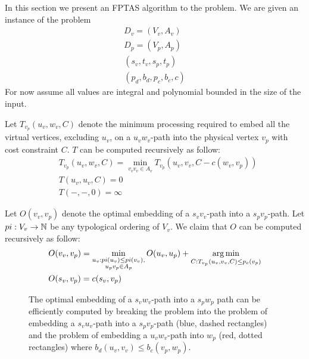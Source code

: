 In this section we present an FPTAS algorithm to the \VPN problem.
We are given an instance of the \VPN problem 
\begin{align*}
D_v = (V_v, A_v)		\\
D_p = (V_p, A_p)		\\
(s_v, t_v, s_p, t_p)	\\
(p_d, b_d, p_c, b_c, c)
\end{align*}
For now assume all values are integral and polynomial bounded in the size of the input.

Let $T_{v_p}(u_v, w_v, C)$ denote the minimum processing required to embed
all the virtual vertices, excluding $u_v$, on a $u_vw_v$-path into the physical
vertex $v_p$ with cost constraint $C$.
$T$ can be computed recursively as follow:
\begin{align*}
&T_{v_p}(u_v, w_v, C) = 
\min_{v_vv_v \in A_v} T_{v_p}(u_v, v_v, C - c(w_v, v_p))
\\
&T(u_v, u_v, C) = 0
\\
&T(-, -, 0) = \infty
\end{align*}
 
Let $O(v_v, v_p)$ denote the optimal embedding of a $s_vv_v$-path into a
$s_pv_p$-path.
Let $pi:V_v \to \mathbb{N}$ be any typological ordering of $V_v$. 
We claim that $O$ can be computed recursively as follow:
\begin{align*}
&O(v_v, v_p) = 
\min_{\substack{
u_v : pi(u_v) \leq pi(v_v), 
\\
u_pv_p \in A_p
}}
O(u_v, u_p)
+
\operatorname*{arg\,min}_{C : T_{v_p}(u_v, v_v, C) \leq p_c(v_p)}
\\
&O(s_v, v_p) = c(s_v, v_p)
\end{align*}

\begin{figure}[ht]
\centering

\caption[]{
The optimal embedding of a $s_vw_v$-path into a $s_pw_p$ path can be efficiently 
computed by breaking the problem into the problem of embedding a $s_vu_v$-path
into a $s_pv_p$-path (blue, dashed rectangles) 
and the problem of embedding a $u_vw_v$-path into $w_p$ (red, dotted
rectangles) where $b_d(u_v, v_v) \leq b_c(v_p, w_p)$.
}
\end{figure}


